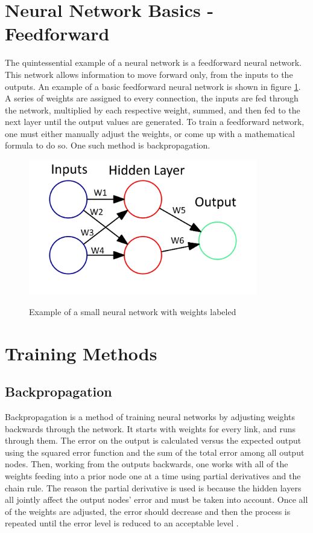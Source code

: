 \documentclass[12pt]{ucthesis}
\newcommand{\captionfonts}{\small\bf\ssp}
\begin{document}
\section{Neural Network Basics - Feedforward}
\label{Neural Network Basics - Feedforward}
The quintessential example of a neural network is a feedforward neural network. This network allows information to move forward only, from the inputs to the outputs. An example of a basic feedforward neural network is shown in figure \ref{fig:smallNN}. A series of weights are assigned to every connection, the inputs are fed through the network, multiplied by each respective weight, summed, and then fed to the next layer until the output values are generated. To train a feedforward network, one must either manually adjust the weights, or come up with a mathematical formula to do so. One such method is backpropagation\cite{feedforwardsource}.

\begin{figure}[t]
\begin{center}
\includegraphics[width=10cm]{simpler.png}
\captionfonts
\caption[Small Neural Network Example]{Example of a small neural network with weights labeled}
\label{fig:smallNN}
\end{center}
\end{figure}
\section{Training Methods}



\subsection{Backpropagation}
\label{Backpropagation Neural Network}
Backpropagation is a method of training neural networks by adjusting weights backwards through the network. It starts with weights for every link, and runs through them. The error on the output is calculated versus the expected output using the squared error function and the sum of the total error among all output nodes. Then, working from the outputs backwards, one works with all of the weights feeding into a prior node one at a time using partial derivatives and the chain rule. The reason the partial derivative is used is because the hidden layers all jointly affect the output nodes' error and must be taken into account. Once all of the weights are adjusted, the error should decrease and then the process is repeated until the error level is reduced to an acceptable level \cite{backpropositionPaper}. 
\end{document}
